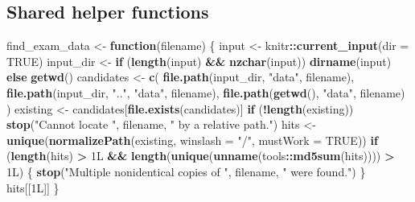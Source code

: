\documentclass[
  11pt,
]{article}
\newenvironment{Shaded}{\begin{snugshade}}{\end{snugshade}}
\newcommand{\AttributeTok}[1]{\textcolor[rgb]{0.13,0.29,0.53}{#1}}
\newcommand{\ConstantTok}[1]{\textcolor[rgb]{0.56,0.35,0.01}{#1}}
\newcommand{\ControlFlowTok}[1]{\textcolor[rgb]{0.13,0.29,0.53}{\textbf{#1}}}
\newcommand{\DataTypeTok}[1]{\textcolor[rgb]{0.13,0.29,0.53}{#1}}
\newcommand{\DecValTok}[1]{\textcolor[rgb]{0.00,0.00,0.81}{#1}}
\newcommand{\FunctionTok}[1]{\textcolor[rgb]{0.13,0.29,0.53}{\textbf{#1}}}
\newcommand{\NormalTok}[1]{#1}
\newcommand{\OtherTok}[1]{\textcolor[rgb]{0.56,0.35,0.01}{#1}}
\newcommand{\SpecialCharTok}[1]{\textcolor[rgb]{0.81,0.36,0.00}{\textbf{#1}}}
\newcommand{\StringTok}[1]{\textcolor[rgb]{0.31,0.60,0.02}{#1}}
\begin{document}
\subsection*{Shared helper functions}\label{shared-helper-functions}

\begin{Shaded}
\begin{Highlighting}[]
\NormalTok{find\_exam\_data }\OtherTok{\textless{}{-}} \ControlFlowTok{function}\NormalTok{(filename) \{}
\NormalTok{  input }\OtherTok{\textless{}{-}}\NormalTok{ knitr}\SpecialCharTok{::}\FunctionTok{current\_input}\NormalTok{(}\AttributeTok{dir =} \ConstantTok{TRUE}\NormalTok{)}
\NormalTok{  input\_dir }\OtherTok{\textless{}{-}} \ControlFlowTok{if}\NormalTok{ (}\FunctionTok{length}\NormalTok{(input) }\SpecialCharTok{\&\&} \FunctionTok{nzchar}\NormalTok{(input)) }\FunctionTok{dirname}\NormalTok{(input) }\ControlFlowTok{else} \FunctionTok{getwd}\NormalTok{()}
\NormalTok{  candidates }\OtherTok{\textless{}{-}} \FunctionTok{c}\NormalTok{(}
    \FunctionTok{file.path}\NormalTok{(input\_dir, }\StringTok{"data"}\NormalTok{, filename),}
    \FunctionTok{file.path}\NormalTok{(input\_dir, }\StringTok{".."}\NormalTok{, }\StringTok{"data"}\NormalTok{, filename),}
    \FunctionTok{file.path}\NormalTok{(}\FunctionTok{getwd}\NormalTok{(), }\StringTok{"data"}\NormalTok{, filename)}
\NormalTok{  )}
\NormalTok{  existing }\OtherTok{\textless{}{-}}\NormalTok{ candidates[}\FunctionTok{file.exists}\NormalTok{(candidates)]}
  \ControlFlowTok{if}\NormalTok{ (}\SpecialCharTok{!}\FunctionTok{length}\NormalTok{(existing)) }\FunctionTok{stop}\NormalTok{(}\StringTok{"Cannot locate "}\NormalTok{, filename, }\StringTok{" by a relative path."}\NormalTok{)}
\NormalTok{  hits }\OtherTok{\textless{}{-}} \FunctionTok{unique}\NormalTok{(}\FunctionTok{normalizePath}\NormalTok{(existing, }\AttributeTok{winslash =} \StringTok{"/"}\NormalTok{, }\AttributeTok{mustWork =} \ConstantTok{TRUE}\NormalTok{))}
  \ControlFlowTok{if}\NormalTok{ (}\FunctionTok{length}\NormalTok{(hits) }\SpecialCharTok{\textgreater{}} \DecValTok{1}\DataTypeTok{L} \SpecialCharTok{\&\&} \FunctionTok{length}\NormalTok{(}\FunctionTok{unique}\NormalTok{(}\FunctionTok{unname}\NormalTok{(tools}\SpecialCharTok{::}\FunctionTok{md5sum}\NormalTok{(hits)))) }\SpecialCharTok{\textgreater{}} \DecValTok{1}\DataTypeTok{L}\NormalTok{) \{}
    \FunctionTok{stop}\NormalTok{(}\StringTok{"Multiple nonidentical copies of "}\NormalTok{, filename, }\StringTok{" were found."}\NormalTok{)}
\NormalTok{  \}}
\NormalTok{  hits[[}\DecValTok{1}\DataTypeTok{L}\NormalTok{]]}
\NormalTok{\}}


\end{Highlighting}
\end{Shaded}
\end{document}
